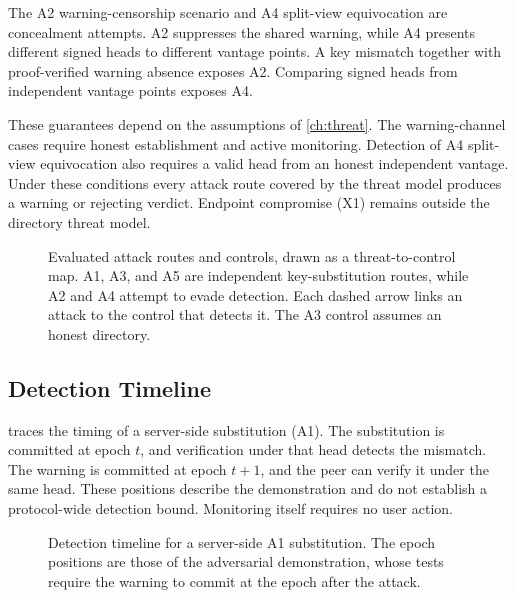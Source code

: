 The A2 warning-censorship scenario and A4 split-view equivocation are concealment attempts. A2 suppresses the shared warning, while A4 presents
different signed heads to different vantage points. A key mismatch together with proof-verified
warning absence exposes A2. Comparing signed heads from independent vantage points exposes A4.

These guarantees depend on the assumptions of \cref{ch:threat}. The warning-channel cases require
honest establishment and active monitoring. Detection of A4 split-view equivocation also requires a valid head from an
honest independent vantage. Under these conditions every attack route covered by the threat model produces a warning or
rejecting verdict. Endpoint compromise (X1) remains outside the directory threat model.

\begin{figure}[ht]
\centering

\caption[Evaluated attack routes and controls.]{Evaluated attack routes and controls, drawn as a
threat-to-control map. A1, A3, and A5 are independent key-substitution routes, while A2 and A4 attempt
to evade detection. Each dashed arrow links an attack to the control that detects it. The A3 control
assumes an honest directory.}
\label{fig:eval-attacktree}
\end{figure}

\FloatBarrier
\subsection{Detection Timeline}\label{ssec:eval-timeline}

 traces the timing of a server-side substitution (A1). The substitution is
committed at epoch $t$, and verification under that head detects the mismatch. The warning is
committed at epoch $t{+}1$, and the peer can verify it under the same head. These positions describe
the demonstration and do not establish a protocol-wide detection bound. Monitoring itself requires
no user action.

\begin{figure}[ht]
\centering

\caption[Detection timeline for a server-side key substitution.]{Detection timeline for a
server-side A1 substitution. The epoch positions are those of the adversarial demonstration, whose
tests require the warning to commit at the epoch after the attack.}
\label{fig:eval-timeline}
\end{figure}
